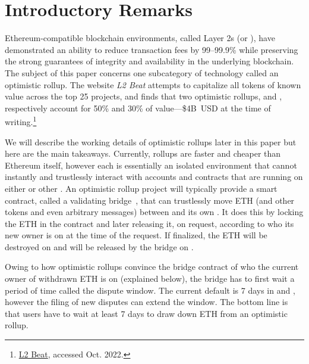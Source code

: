 \section{Introductory Remarks}

Ethereum-compatible blockchain environments, called Layer 2s (or \layertwos), have demonstrated an ability to reduce transaction fees by 99--99.9\% while preserving the strong guarantees of integrity and availability in the underlying blockchain. The subject of this paper concerns one subcategory of \layertwo technology called an optimistic rollup. The website \textit{L2 Beat} attempts to capitalize all tokens of known value across the top 25 \layertwo projects, and finds that two optimistic rollups, \arb and \opt, respectively account for 50\% and 30\% of \layertwo value---\$4B~USD at the time of writing.\footnote{\href{https://l2beat.com/scaling/tvl/}{L2 Beat}, accessed Oct. 2022.}

We will describe the working details of optimistic rollups later in this paper but here are the main takeaways. Currently, rollups are faster and cheaper than Ethereum itself, however each \layertwo is essentially an isolated environment that cannot instantly and trustlessly interact with accounts and contracts that are running on either \layerone or other \layertwos. An optimistic rollup project will typically provide a smart contract, called a validating bridge~\cite{mccorry2021sok}, that can trustlessly move ETH (and other tokens and even arbitrary messages) between \layerone and its own \layertwo. It does this by locking the ETH in the \layerone contract and later releasing it, on request, according to who its new owner is on \layertwo at the time of the request. If finalized, the ETH will be destroyed on \layertwo and will be released by the bridge on \layerone.

Owing to how optimistic rollups convince the \layerone bridge contract of who the current owner of withdrawn ETH is on \layertwo (explained below), the bridge has to first wait a period of time called the dispute window. The current default is 7 days in \arb and \opt, however the filing of new disputes can extend the window. The bottom line is that users have to wait at least 7 days to draw down ETH from an optimistic rollup. 

